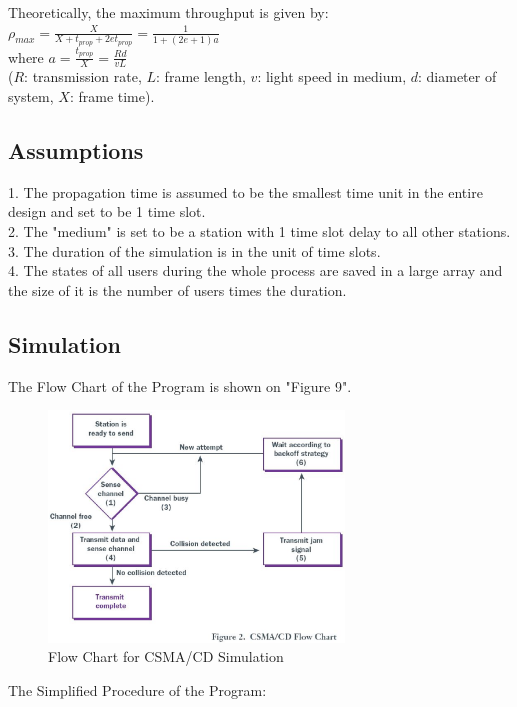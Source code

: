 \documentclass[11pt,a4paper]{report}
\begin{document}
Theoretically, the maximum throughput is given by: \\

\qquad \(\rho_{max} = \frac{X}{X+t_{prop}+2et_{prop}} = \frac{1}{1+(2e+1)a}\) \\
where \(a = \frac{t_{prop}}{X} = \frac{Rd}{vL}\) \\
(\(R\): transmission rate, \(L\): frame length, \(v\): light speed in medium, \(d\): diameter of system, \(X\): frame time).

\subsection*{Assumptions}
1. The propagation time is assumed to be the smallest time unit in the entire design and set to be 1 time slot. \\
2. The "medium" is set to be a station with 1 time slot delay to all other stations. \\
3. The duration of the simulation is in the unit of time slots. \\
4. The states of all users during the whole process are saved in a large array and the size of it is the number of users times the duration.

\subsection*{Simulation}
The Flow Chart of the Program is shown on "Figure 9". \\
\begin{figure}
\centering
\includegraphics[width=0.7\textwidth]{4_1.eps}
\caption{Flow Chart for CSMA/CD Simulation}
\end{figure}

The Simplified Procedure of the Program: \\
\end{document}
